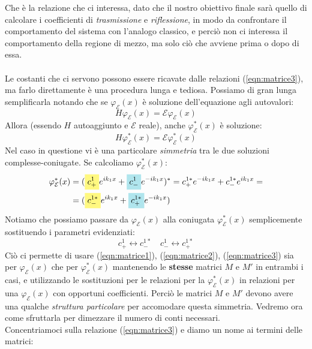 \documentclass[../../FisicaTeorica.tex]{subfiles}
\begin{document}
Che è la relazione che ci interessa, dato che il nostro obiettivo finale sarà quello di calcolare i coefficienti di \textit{trasmissione} e \textit{riflessione}, in modo da confrontare il comportamento del sistema con l'analogo classico, e perciò non ci interessa il comportamento della regione di mezzo, ma solo ciò che avviene prima o dopo di essa.\\
\\
Le costanti che ci servono possono essere ricavate dalle relazioni (\ref{eqn:matrice3}), ma farlo direttamente è una procedura lunga e tediosa. Possiamo di gran lunga semplificarla notando che se $\varphi_\mathcal{E}(x)$ è soluzione dell'equazione agli autovalori:
\[
H\varphi_\mathcal{E}(x)=\mathcal{E}\varphi_\mathcal{E}(x)
\]
Allora (essendo $H$ autoaggiunto e $\mathcal{E}$ reale), anche $\varphi_\mathcal{E}^*(x)$ è soluzione:
\[
H\varphi_\mathcal{E}^*(x)=\mathcal{E}\varphi_\mathcal{E}^*(x)
\]
Nel caso in questione vi è una particolare \textit{simmetria} tra le due soluzioni complesse-coniugate. Se calcoliamo $\varphi_\mathcal{E}^*(x)$:
\begin{align*}
\varphi_\mathcal{E}^*(x)&= (\hlc{Yellow}{c^1_+} e^{ik_1 x} + \hlc{SkyBlue}{c_-^1 }e^{-ik_1x})^* = c^{1*}_+ e^{-ik_1x}+c^{1*}_- e^{ik_1x} =\\
&= (\hlc{Yellow}{c^{1*}_-} e^{ik_1x}+\hlc{SkyBlue}{c^{1*}_+} e^{-ik_1 x})
\end{align*} 
Notiamo che possiamo passare da $\varphi_\mathcal{E}(x)$ alla coniugata $\varphi_\mathcal{E}^*(x)$ semplicemente sostituendo i parametri evidenziati:
\begin{equation}
c^1_+ \leftrightarrow c^{1*}_- \quad c^1_- \leftrightarrow c^{1*}_+
\label{eqn:sostituzioni_coniugate}
\end{equation}
Ciò ci permette di usare (\ref{eqn:matrice1}), (\ref{eqn:matrice2}), (\ref{eqn:matrice3})  sia per $\varphi_\mathcal{E}(x)$ che per $\varphi_\mathcal{E}^*(x)$ mantenendo le \textbf{stesse}  matrici $M$ e $M'$ in entrambi i casi, e utilizzando le sostituzioni per  le relazioni per la $\varphi_\mathcal{E}^*(x)$ in relazioni per una $\varphi_\mathcal{E}(x)$ con opportuni coefficienti. Perciò le matrici $M$ e $M'$  devono avere una qualche \textit{struttura particolare} per accomodare questa simmetria. Vedremo ora come sfruttarla per dimezzare il numero di conti necessari.\\ %
Concentriamoci sulla relazione (\ref{eqn:matrice3}) e diamo un nome ai termini delle matrici:
\end{document}
